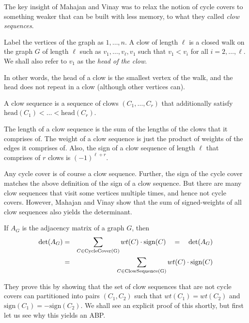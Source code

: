 The key insight of Mahajan and Vinay was to relax the notion of cycle covers to something weaker that can be built with less memory, to what they called \emph{clow sequences}. 

\begin{definition}
Label the vertices of the graph as $1,\dots, n$. 
A clow  of length $\ell$ is a closed walk on the graph $G$ of length $\ell$ such as $v_1,\dots, v_\ell,v_1$ such that $v_1 < v_i$ for all $i=2,\dots, \ell$. 
We shall also refer to $v_1$ as the \emph{head of the clow}. 

In other words, the head of a clow is the smallest vertex of the walk, and the head does not repeat in a clow (although other vertices can). 

A clow sequence is a sequence of clows $(C_1,\dots, C_r)$ that additionally satisfy $\mathrm{head}(C_1) < \dots < \mathrm{head}(C_r)$. 

The length of a clow sequence is the sum of the lengths of the clows that it comprises of. 
The weight of a clow sequence is just the product of weights of the edges it comprises of. 
Also, the sign of a clow sequence of length $\ell$ that comprises of $r$ clows is $(-1)^{\ell + r}$. 
\end{definition}

Any cycle cover is of course a clow sequence. 
Further, the sign of the cycle cover matches the above definition of the sign of a clow sequence. 
But there are many clow sequences that visit some vertices multiple times, and hence not cycle covers. 
However, Mahajan and Vinay show that the sum of signed-weights of all clow sequences also yields the determinant. 

\begin{lemma}[\cite{mv97}]\label{lem:mv-clowseq} If $A_G$ is the adjacency matrix of a graph $G$, then
\begin{eqnarray*}
\det(A_G) & = &  \sum_{C \in \mathrm{CycleCover(G)}} wt(C) \cdot \mathrm{sign}(C) \quad = \quad \det(A_G)\\
& = & \sum_{C \in \mathrm{ClowSequence(G)}} wt(C) \cdot \mathrm{sign}(C)
\end{eqnarray*}
\end{lemma}

They prove this by showing that the set of clow sequences that are not cycle covers can partitioned into pairs $(C_1,C_2)$ such that $wt(C_1) = wt(C_2)$ and $\mathrm{sign}(C_1) = - \mathrm{sign}(C_2)$. 
We shall see an explicit proof of this shortly, but first let us see why this yields an ABP. \\

